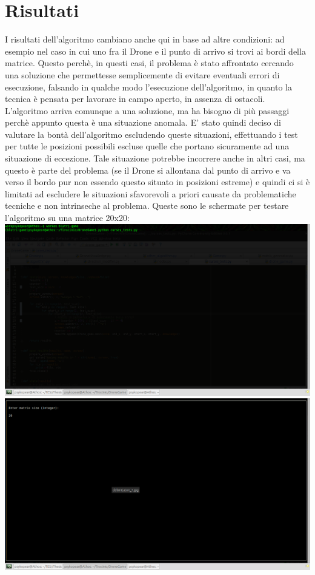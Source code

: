 \section{Risultati}
I risultati dell'algoritmo cambiano anche qui in base ad altre condizioni: ad esempio nel caso in cui uno fra il Drone e il punto di arrivo si trovi ai bordi della matrice. Questo perchè, in questi casi, il problema è stato affrontato cercando una soluzione che permettesse semplicemente di evitare eventuali errori di esecuzione, falsando in qualche modo l'esecuzione dell'algoritmo, in quanto la tecnica è pensata per lavorare in campo aperto, in assenza di ostacoli. L'algoritmo arriva comunque a una soluzione, ma ha bisogno di più passaggi perchè appunto questa è una situazione anomala. E' stato quindi deciso di valutare la bontà dell'algoritmo escludendo queste situazioni, effettuando i test per tutte le posizioni possibili escluse quelle che portano sicuramente ad una situazione di eccezione. Tale situazione potrebbe incorrere anche in altri casi, ma questo è parte del problema (se il Drone si allontana dal punto di arrivo e va verso il bordo pur non essendo questo situato in posizioni estreme) e quindi ci si è limitati ad escludere le situazioni sfavorevoli a priori causate da problematiche tecniche e non intrinseche al problema.
Queste sono le schermate per testare l'algoritmo su una matrice 20x20:
\includegraphics[width=\textwidth]{immagini/Test1.png}
\includegraphics[width=\textwidth]{immagini/Test1-1.png}
